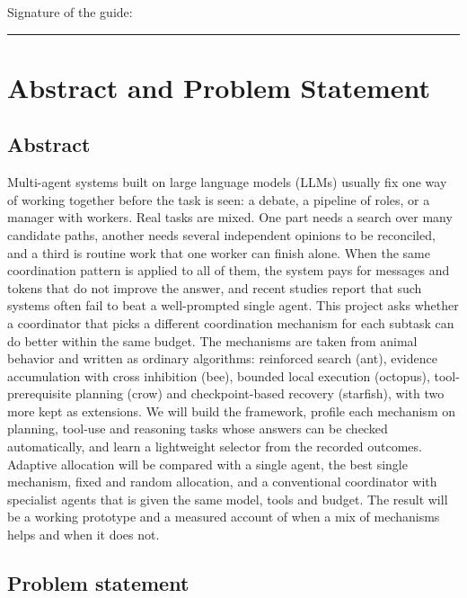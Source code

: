 \documentclass[11pt,a4paper]{article}
\begin{document}
\vspace{14pt}
\hfill Signature of the guide:\enspace\rule{5cm}{0.4pt}

\section{Abstract and Problem Statement}

\subsection{Abstract}

Multi-agent systems built on large language models (LLMs) usually fix one way of working together before
the task is seen: a debate, a pipeline of roles, or a manager with workers. Real tasks are mixed. One part
needs a search over many candidate paths, another needs several independent opinions to be reconciled, and a
third is routine work that one worker can finish alone. When the same coordination pattern is applied to all
of them, the system pays for messages and tokens that do not improve the answer, and recent studies report
that such systems often fail to beat a well-prompted single agent. This project asks whether a coordinator
that picks a different coordination mechanism for each subtask can do better within the same budget. The
mechanisms are taken from animal behavior and written as ordinary algorithms: reinforced search (ant),
evidence accumulation with cross inhibition (bee), bounded local execution (octopus), tool-prerequisite
planning (crow) and checkpoint-based recovery (starfish), with two more kept as extensions. We will build
the framework, profile each mechanism on planning, tool-use and reasoning tasks whose answers can be checked
automatically, and learn a lightweight selector from the recorded outcomes. Adaptive allocation will be
compared with a single agent, the best single mechanism, fixed and random allocation, and a conventional
coordinator with specialist agents that is given the same model, tools and budget. The result will be a
working prototype and a measured account of when a mix of mechanisms helps and when it does not.

\subsection{Problem statement}
\end{document}
